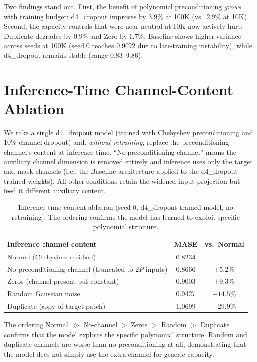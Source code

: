 \documentclass[11pt]{article}
\theoremstyle{plain}
\theoremstyle{definition}
\theoremstyle{remark}
\newcommand{\HD}{\textsf{d4\_dropout}}
\begin{document}
Two findings stand out. First, the benefit of polynomial preconditioning \emph{grows} with training budget: \HD{} improves by $3.9\%$ at 100K (vs.\ $2.9\%$ at 10K). Second, the capacity controls that were near-neutral at 10K now actively hurt: Duplicate degrades by $0.9\%$ and Zero by $1.7\%$. Baseline shows higher variance across seeds at 100K (seed 0 reaches $0.9092$ due to late-training instability), while \HD{} remains stable (range $0.83$--$0.86$).

\section{Inference-Time Channel-Content Ablation}
\label{app:inference-ablation}

We take a single \HD{} model (trained with Chebyshev preconditioning and $10\%$ channel dropout) and, \emph{without retraining}, replace the preconditioning channel's content at inference time. ``No preconditioning channel'' means the auxiliary channel dimension is removed entirely and inference uses only the target and mask channels (i.e., the Baseline architecture applied to the \HD{}-trained weights). All other conditions retain the widened input projection but feed it different auxiliary content.

\begin{table}[h]
\centering
\caption{Inference-time content ablation (seed 0, \HD{}-trained model, no retraining). The ordering confirms the model has learned to exploit specific polynomial structure.}
\small
\begin{tabular}{lcc}
\toprule
\textbf{Inference channel content} & \textbf{MASE} & \textbf{vs.\ Normal} \\
\midrule
Normal (Chebyshev residual) & 0.8234 & --- \\
No preconditioning channel (truncated to $2P$ inputs) & 0.8666 & $+5.2\%$ \\
Zeros (channel present but constant) & 0.9003 & $+9.3\%$ \\
Random Gaussian noise & 0.9427 & $+14.5\%$ \\
Duplicate (copy of target patch) & 1.0699 & $+29.9\%$ \\
\bottomrule
\end{tabular}
\end{table}

The ordering Normal $\gg$ No-channel $>$ Zeros $>$ Random $>$ Duplicate confirms that the model exploits the specific polynomial structure. Random and duplicate channels are worse than no preconditioning at all, demonstrating that the model does not simply use the extra channel for generic capacity.
\end{document}
